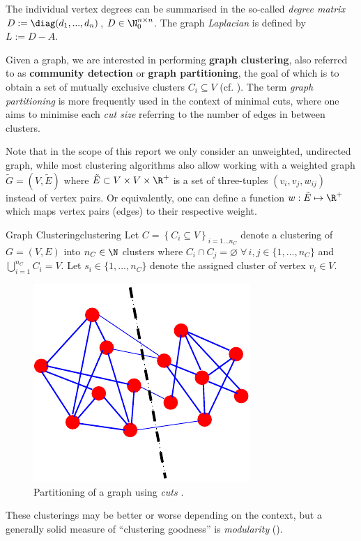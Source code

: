 \documentclass[12pt, a4paper]{article}
\let\emptyset\varnothing
\begin{document}
  The individual vertex degrees can be summarised in the so-called \textit{degree matrix} $D := \diag(d_1, ..., d_n)$, $D \in \N_0^{n \times n}$. The graph \textit{Laplacian} is defined by $L := D - A$.

  Given a graph, we are interested in performing \textbf{graph clustering}, also referred to as \textbf{community detection} or \textbf{graph partitioning}, the goal of which is to obtain a set of mutually exclusive clusters $C_i \subseteq V$ (cf. ).
  The term \textit{graph partitioning} is more frequently used in the context of minimal cuts, where one aims to minimise each \textit{cut size} referring to the number of edges in between clusters.

  Note that in the scope of this report we only consider an unweighted, undirected graph, while most clustering algorithms also allow working with a weighted graph $\tilde{G} = (V, \tilde{E})$ where $\tilde{E} \subset V \times V \times \R^+$ is a set of three-tuples $(v_i, v_j, w_{ij})$ instead of vertex pairs. Or equivalently, one can define a function $w: \tilde{E} \mapsto \R^+$ which maps vertex pairs (edges) to their respective weight.

  \begin{definition}{Graph Clustering}{clustering}
    Let $C = \left\{C_i \subseteq V \right\}_{i=1 ... n_C}$ denote a clustering of $G = (V, E)$ into $n_C \in \N$ clusters where $C_i \cap C_j = \emptyset \; \forall\,i, j \in \{1, ..., n_C\}$ and $\bigcup_{i=1}^{n_C} C_i = V$. Let $s_i \in \{1, ..., n_C\}$ denote the assigned cluster of vertex $v_i \in V$.
  \end{definition}

  \begin{figure}[h]
    \centering
    \includegraphics[width=0.3\linewidth]{figures/graphpartitioning.pdf}
    \caption{Partitioning of a graph using \textit{cuts} \parencite{fortunato-2009}.}
  \end{figure}

  These clusterings may be better or worse depending on the context, but a generally solid measure of ``clustering goodness'' is \textit{modularity} ().
\end{document}

